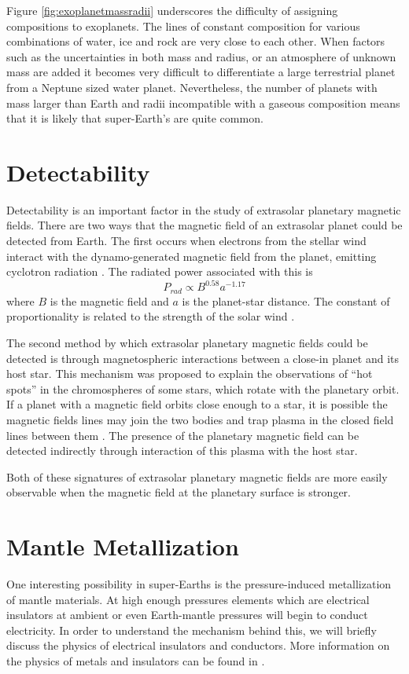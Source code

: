Figure \ref{fig:exoplanetmassradii} underscores the difficulty of assigning compositions to exoplanets. The lines of constant composition for various combinations of water, ice and rock are very close to each other. When factors such as the uncertainties in both mass and radius, or an atmosphere of unknown mass \citep{adams2008} are added it becomes very difficult to differentiate a large terrestrial planet from a Neptune sized water planet. Nevertheless, the number of planets with mass larger than Earth and radii incompatible with a gaseous composition means that it is likely that super-Earth's are quite common.

\section{Detectability}
Detectability is an important factor in the study of extrasolar planetary magnetic fields. There are two ways that the magnetic field of an extrasolar planet could be detected from Earth. The first occurs when electrons from the stellar wind interact with the dynamo-generated magnetic field from the planet, emitting cyclotron radiation \citep{farrell1999, griessmeier2007, lecacheux1991}. The radiated power associated with this is 
\begin{equation}
P_{rad}\propto B^{0.58} a^{-1.17}
\end{equation}
where $B$ is the magnetic field and $a$ is the planet-star distance. The constant of proportionality is related to the strength of the solar wind \citep{farrell1999}.

The second method by which extrasolar planetary magnetic fields could be detected is through magnetospheric interactions between a close-in planet and its host star. This mechanism was proposed to explain the observations of ``hot spots'' in the chromospheres of some stars, which rotate with the planetary orbit. If a planet with a magnetic field orbits close enough to a star, it is possible the magnetic fields lines may join the two bodies and trap plasma in the closed field lines between them \citep{cohen2009}. The presence of the planetary magnetic field can be detected indirectly through interaction of this plasma with the host star.

Both of these signatures of extrasolar planetary magnetic fields are more easily observable when the magnetic field at the planetary surface is stronger.

\section{Mantle Metallization}
One interesting possibility in super-Earths is the pressure-induced metallization of mantle materials. At high enough pressures elements which are electrical insulators at ambient or even Earth-mantle pressures will begin to conduct electricity. In order to understand the mechanism behind this, we will briefly discuss the physics of electrical insulators and conductors. More information on the physics of metals and insulators can be found in \citet{ashcroftandmermin}.

